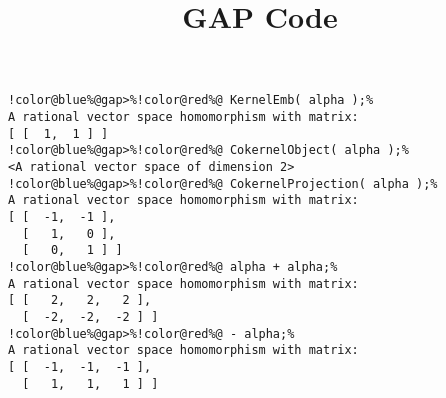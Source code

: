 \documentclass[12pt]{amsart}
\title{GAP Code}
\author{}
\begin{document}
\maketitle

\begin{Verbatim}[commandchars=!@\%,frame=single]
!color@blue%@gap>%!color@red%@ KernelEmb( alpha );%
A rational vector space homomorphism with matrix:
[ [  1,  1 ] ]
!color@blue%@gap>%!color@red%@ CokernelObject( alpha );%
<A rational vector space of dimension 2>
!color@blue%@gap>%!color@red%@ CokernelProjection( alpha );%
A rational vector space homomorphism with matrix: 
[ [  -1,  -1 ],
  [   1,   0 ],
  [   0,   1 ] ]
!color@blue%@gap>%!color@red%@ alpha + alpha;%
A rational vector space homomorphism with matrix: 
[ [   2,   2,   2 ],
  [  -2,  -2,  -2 ] ]
!color@blue%@gap>%!color@red%@ - alpha;%
A rational vector space homomorphism with matrix: 
[ [  -1,  -1,  -1 ],
  [   1,   1,   1 ] ]
\end{Verbatim}
\end{document}

